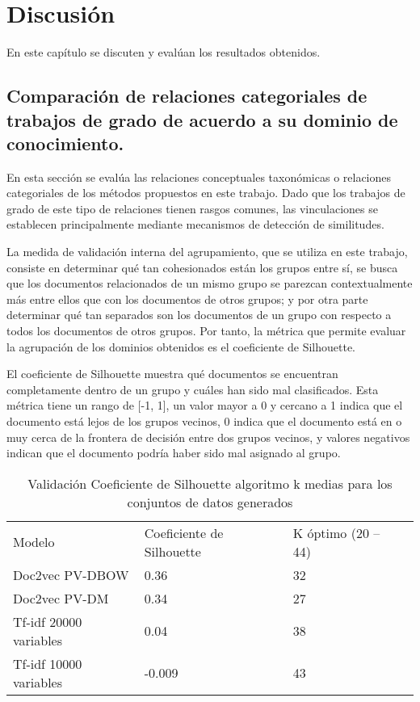 \chapter{Discusión }


En este capítulo se discuten y evalúan los resultados obtenidos.

\section{Comparación  de relaciones categoriales  de trabajos de grado de acuerdo a su dominio de conocimiento.}

En esta sección se evalúa las relaciones conceptuales taxonómicas o relaciones categoriales de los métodos propuestos en este trabajo. Dado que los trabajos de grado de este tipo de relaciones tienen rasgos comunes, las vinculaciones se establecen principalmente mediante mecanismos de detección de similitudes.

La medida de validación interna del agrupamiento, que se utiliza en este trabajo, consiste en determinar qué tan cohesionados están los grupos entre sí, se busca que los documentos relacionados de un mismo grupo se parezcan contextualmente más entre ellos que con los documentos de otros grupos; y por otra parte determinar qué tan separados son los documentos de un grupo con respecto a todos los documentos de otros grupos. 
Por tanto, la métrica que permite evaluar la agrupación de los dominios obtenidos es el coeficiente de Silhouette.

El coeficiente de Silhouette muestra qué documentos se encuentran completamente dentro de un grupo y cuáles han sido mal clasificados. Esta métrica tiene un rango de [-1, 1], un valor  mayor a 0 y cercano a 1 indica que el documento está lejos de los grupos vecinos, 0 indica que el documento está en o muy cerca de la frontera de decisión entre dos grupos vecinos, y valores negativos indican que el documento podría haber sido mal asignado al grupo.

\begin{table}[H]\centering
\caption{Validación Coeficiente de Silhouette algoritmo k medias para los conjuntos de datos generados }\label{tab:tablaeres}
	\begin{tabularx}{\textwidth}{XXXm{3.0cm}}\toprule

Modelo &  Coeficiente de Silhouette & K óptimo (20 –44)  \\
Doc2vec PV-DBOW & 0.36 & 32 \\
Doc2vec PV-DM &  0.34  & 27\\
Tf-idf 20000 variables & 0.04 & 38  \\
Tf-idf 10000 variables & -0.009 & 43 \\

 \bottomrule
	\end{tabularx}
\end{table}


